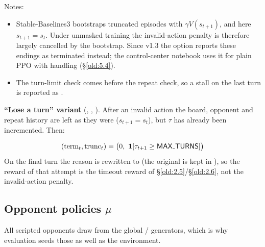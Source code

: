 Notes:

\begin{itemize}
\item Stable-Baselines3 bootstraps truncated episodes with $\gamma V(s_{t+1})$, and here $s_{t+1} = s_t$. Under unmasked training the invalid-action penalty is therefore largely cancelled by the bootstrap. Since v1.3 the option  reports these endings as terminated instead; the control-center notebook uses it for plain PPO with  handling (\S\ref{old:5.4}).
\item The turn-limit check comes before the repeat check, so a stall on the last turn is reported as .
\end{itemize}
\textbf{``Lose a turn'' variant} (, , ). After an invalid action the board, opponent and repeat history are left as they were ($s_{t+1} = s_t$), but $\tau$ has already been incremented. Then:

\[
(\text{term}_t, \text{trunc}_t) = \big(0,\ \ind[\tau_{t+1} \geq \knob{MAX\_TURNS}]\big)
\]
On the final turn the reason is rewritten to  (the original is kept in ), so the reward of that attempt is the timeout reward of \S\ref{old:2.5}/\S\ref{old:2.6}, not the invalid-action penalty.

\subsection{Opponent policies $\mu$}\label{old:2.4}

All scripted opponents draw from the global  /  generators, which is why evaluation seeds those as well as the environment.

